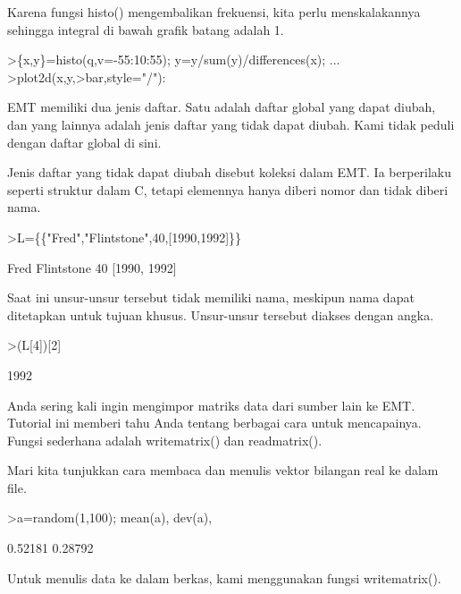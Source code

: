 \documentclass[a4paper,10pt]{article}
\begin{document}
\begin{eulernotebook}
\begin{eulercomment}
Karena fungsi histo() mengembalikan frekuensi, kita perlu
menskalakannya sehingga integral di bawah grafik batang adalah 1.
\end{eulercomment}
\begin{eulerprompt}
>\{x,y\}=histo(q,v=-55:10:55); y=y/sum(y)/differences(x); ...
>plot2d(x,y,>bar,style="/"):
\end{eulerprompt}
\begin{eulercomment}
EMT memiliki dua jenis daftar. Satu adalah daftar global yang dapat
diubah, dan yang lainnya adalah jenis daftar yang tidak dapat diubah.
Kami tidak peduli dengan daftar global di sini.

Jenis daftar yang tidak dapat diubah disebut koleksi dalam EMT. Ia
berperilaku seperti struktur dalam C, tetapi elemennya hanya diberi
nomor dan tidak diberi nama.
\end{eulercomment}
\begin{eulerprompt}
>L=\{\{"Fred","Flintstone",40,[1990,1992]\}\}
\end{eulerprompt}
\begin{euleroutput}
  Fred
  Flintstone
  40
  [1990,  1992]
\end{euleroutput}
\begin{eulercomment}
Saat ini unsur-unsur tersebut tidak memiliki nama, meskipun nama dapat
ditetapkan untuk tujuan khusus. Unsur-unsur tersebut diakses dengan
angka.
\end{eulercomment}
\begin{eulerprompt}
>(L[4])[2]
\end{eulerprompt}
\begin{euleroutput}
  1992
\end{euleroutput}
\begin{eulercomment}
Anda sering kali ingin mengimpor matriks data dari sumber lain ke EMT.
Tutorial ini memberi tahu Anda tentang berbagai cara untuk
mencapainya. Fungsi sederhana adalah writematrix() dan readmatrix().

Mari kita tunjukkan cara membaca dan menulis vektor bilangan real ke
dalam file.
\end{eulercomment}
\begin{eulerprompt}
>a=random(1,100); mean(a), dev(a),
\end{eulerprompt}
\begin{euleroutput}
  0.52181
  0.28792
\end{euleroutput}
\begin{eulercomment}
Untuk menulis data ke dalam berkas, kami menggunakan fungsi
writematrix().


\end{eulercomment}
\end{eulernotebook}
\end{document}
